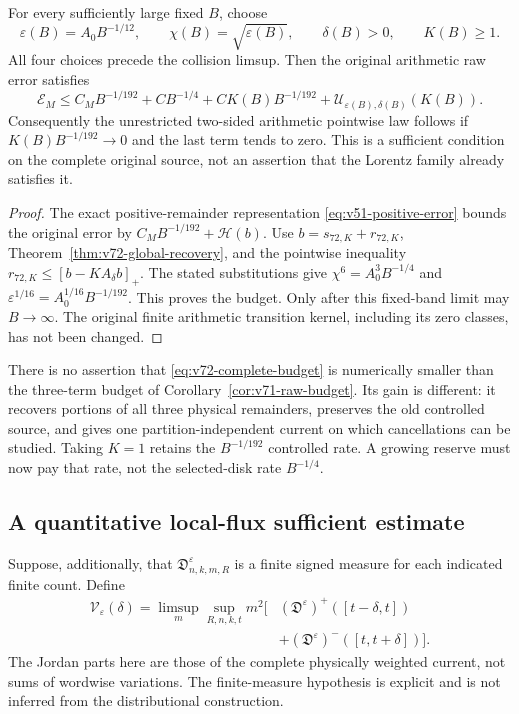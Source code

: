 \begin{theorem}
\label{thm:v72-complete-budget}
For every sufficiently large fixed $B$, choose
\[
 \varepsilon(B)=A_0B^{-1/12},\qquad
 \chi(B)=\sqrt{\varepsilon(B)},\qquad
 \delta(B)>0,\qquad K(B)\ge1.
\]
All four choices precede the collision limsup. Then the original
arithmetic raw error satisfies
\begin{equation}\label{eq:v72-complete-budget}
 \mathcal E_M\le C_MB^{-1/192}+CB^{-1/4}
       +CK(B)B^{-1/192}
       +\mathcal U_{\varepsilon(B),\delta(B)}(K(B)).
\end{equation}
Consequently the unrestricted two-sided arithmetic pointwise law
follows if $K(B)B^{-1/192}\to0$ and the last term tends to zero.
This is a sufficient condition on the complete original source,
not an assertion that the Lorentz family already satisfies it.
\end{theorem}
\begin{proof}
The exact positive-remainder representation
\eqref{eq:v51-positive-error} bounds the original error by
$C_MB^{-1/192}+\mathcal H(b)$. Use
$b=s_{72,K}+r_{72,K}$, Theorem~\ref{thm:v72-global-recovery},
and the pointwise inequality
$r_{72,K}\le[b-KA_\delta b]_+$. The stated substitutions give
$\chi^6=A_0^3B^{-1/4}$ and
$\varepsilon^{1/16}=A_0^{1/16}B^{-1/192}$. This proves the
budget. Only after this fixed-band limit may $B\to\infty$.
The original finite arithmetic transition kernel, including its zero
classes, has not been changed.
\end{proof}

There is no assertion that \eqref{eq:v72-complete-budget} is
numerically smaller than the three-term budget of
Corollary~\ref{cor:v71-raw-budget}. Its gain is different: it
recovers portions of all three physical remainders, preserves the
old controlled source, and gives one partition-independent current
on which cancellations can be studied. Taking $K=1$ retains the
$B^{-1/192}$ controlled rate. A growing reserve must now pay that
rate, not the selected-disk rate $B^{-1/4}$.

\subsection{A quantitative local-flux sufficient estimate}
Suppose, additionally, that $\mathfrak D^\varepsilon_{n,k,m,R}$
is a finite signed measure for each indicated finite count. Define
\begin{equation}\label{eq:v72-directed-flux-height}
 \begin{split}
 \mathcal V_\varepsilon(\delta)=\limsup_m\sup_{R,n,k,t}m^2
 \bigl[& (\mathfrak D^\varepsilon)^+([t-\delta,t])\\
       &+(\mathfrak D^\varepsilon)^-([t,t+\delta])\bigr].
 \end{split}
\end{equation}
The Jordan parts here are those of the complete physically weighted
current, not sums of wordwise variations. The finite-measure
hypothesis is explicit and is not inferred from the distributional
construction.

